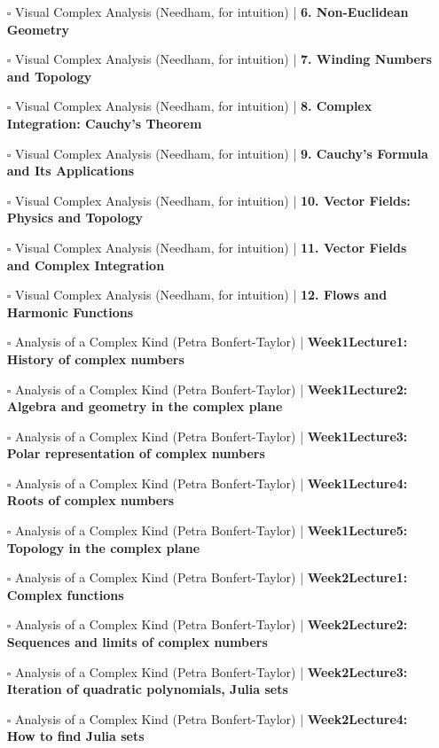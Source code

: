 \documentclass[a4, landscape, 12pt]{article}
\newcommand{\checkbox}{$\square$}%
\begin{document}
\begin{itemize}
{}
\item [\checkbox] Visual Complex Analysis (Needham, for intuition)  | \textbf{6. Non-Euclidean Geometry
}
\item [\checkbox] Visual Complex Analysis (Needham, for intuition)  | \textbf{7. Winding Numbers and Topology
}
\item [\checkbox] Visual Complex Analysis (Needham, for intuition)  | \textbf{8. Complex Integration: Cauchy's Theorem
}
\item [\checkbox] Visual Complex Analysis (Needham, for intuition)  | \textbf{9. Cauchy's Formula and Its Applications
}
\item [\checkbox] Visual Complex Analysis (Needham, for intuition)  | \textbf{10. Vector Fields: Physics and Topology
}
\item [\checkbox] Visual Complex Analysis (Needham, for intuition)  | \textbf{11. Vector Fields and Complex Integration
}
\item [\checkbox] Visual Complex Analysis (Needham, for intuition)  | \textbf{12. Flows and Harmonic Functions
}
\item [\checkbox] Analysis of a Complex Kind (Petra Bonfert-Taylor)  | \textbf{Week1Lecture1: History of complex numbers
}
\item [\checkbox] Analysis of a Complex Kind (Petra Bonfert-Taylor)  | \textbf{Week1Lecture2: Algebra and geometry in the complex plane
}
\item [\checkbox] Analysis of a Complex Kind (Petra Bonfert-Taylor)  | \textbf{Week1Lecture3: Polar representation of complex numbers
}
\item [\checkbox] Analysis of a Complex Kind (Petra Bonfert-Taylor)  | \textbf{Week1Lecture4: Roots of complex numbers
}
\item [\checkbox] Analysis of a Complex Kind (Petra Bonfert-Taylor)  | \textbf{Week1Lecture5: Topology in the complex plane
}
\item [\checkbox] Analysis of a Complex Kind (Petra Bonfert-Taylor)  | \textbf{Week2Lecture1: Complex functions
}
\item [\checkbox] Analysis of a Complex Kind (Petra Bonfert-Taylor)  | \textbf{Week2Lecture2: Sequences and limits of complex numbers
}
\item [\checkbox] Analysis of a Complex Kind (Petra Bonfert-Taylor)  | \textbf{Week2Lecture3: Iteration of quadratic polynomials, Julia sets
}
\item [\checkbox] Analysis of a Complex Kind (Petra Bonfert-Taylor)  | \textbf{Week2Lecture4: How to find Julia sets
}
\end{itemize}
\end{document}
